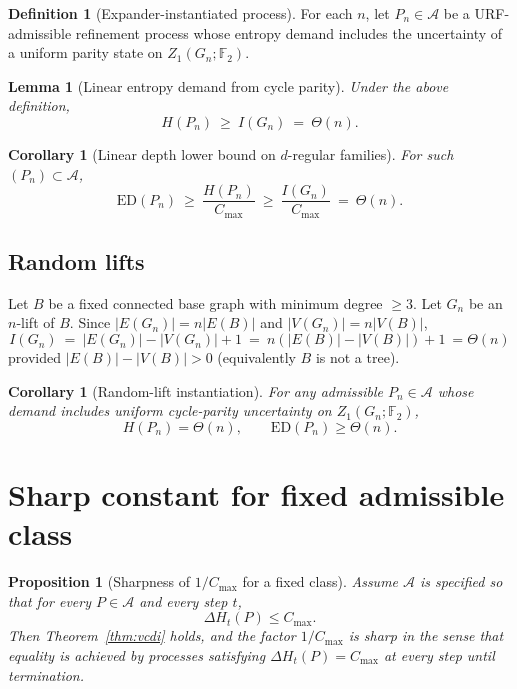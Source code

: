\documentclass[11pt]{article}
\newtheorem{lemma}[theorem]{Lemma}
\newtheorem{proposition}[theorem]{Proposition}
\newtheorem{corollary}[theorem]{Corollary}
\theoremstyle{definition}
\newtheorem{definition}[theorem]{Definition}
\theoremstyle{remark}
\newcommand{\ED}{\mathrm{ED}}
\newcommand{\F}{\mathbb{F}}
\begin{document}
\begin{definition}[Expander-instantiated process]
For each \(n\), let \(P_n\in\mathcal{A}\) be a URF-admissible refinement process whose entropy demand includes the uncertainty of a uniform parity state on \(Z_1(G_n;\F_2)\).
\end{definition}

\begin{lemma}[Linear entropy demand from cycle parity]
\label{lem:linearH}
Under the above definition,
\[
H(P_n)\ \ge\ I(G_n)\ =\ \Theta(n).
\]
\end{lemma}

\begin{corollary}[Linear depth lower bound on \(d\)-regular families]
\label{cor:linearED}
For such \((P_n)\subset\mathcal{A}\),
\[
\ED(P_n)\ \ge\ \frac{H(P_n)}{C_{\max}}\ \ge\ \frac{I(G_n)}{C_{\max}}\ =\ \Theta(n).
\]
\end{corollary}

\subsection{Random lifts}
Let \(B\) be a fixed connected base graph with minimum degree \(\ge 3\). Let \(G_n\) be an \(n\)-lift of \(B\).
Since \(|E(G_n)|=n|E(B)|\) and \(|V(G_n)|=n|V(B)|\),
\[
I(G_n)\ =\ |E(G_n)|-|V(G_n)|+1\ =\ n(|E(B)|-|V(B)|)+1\ =\Theta(n)
\]
provided \(|E(B)|-|V(B)|>0\) (equivalently \(B\) is not a tree).

\begin{corollary}[Random-lift instantiation]
\label{cor:lifts}
For any admissible \(P_n\in\mathcal{A}\) whose demand includes uniform cycle-parity uncertainty on \(Z_1(G_n;\F_2)\),
\[
H(P_n)=\Theta(n),
\qquad
\ED(P_n)\ge \Theta(n).
\]
\end{corollary}

\section{Sharp constant for fixed admissible class}
\begin{proposition}[Sharpness of \(1/C_{\max}\) for a fixed class]
\label{prop:sharp}
Assume \(\mathcal{A}\) is specified so that for every \(P\in\mathcal{A}\) and every step \(t\),
\[
\Delta H_t(P)\le C_{\max}.
\]
Then Theorem~\ref{thm:vcdi} holds, and the factor \(1/C_{\max}\) is sharp in the sense that equality is achieved by processes satisfying \(\Delta H_t(P)=C_{\max}\) at every step until termination.
\end{proposition}
\end{document}
